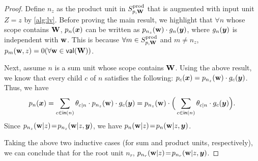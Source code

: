 \documentclass{article} %
\begin{document}
\begin{proof}
Define $n_z$ as the product unit in $S_{{p},\mathbf{W}}^{\mathrm{prod}}$ that is augmented with input unit $Z = z$ by \cref{alg:lv}. Before proving the main result, we highlight that $\forall n$ whose scope contains $\mathbf{W}$, ${p}_{n}(\boldsymbol{x})$ can be written as ${p}_{n_{z}}(\mathbf{w}) \cdot g_{n}(\boldsymbol{y})$, where $g_{n}(\boldsymbol{y})$ is independent with $\mathbf{w}$. This is because $\forall m \in S_{{p},\mathbf{W}}^{\mathrm{prod}}$ and $m \neq n_z$, ${p}_{m}(\mathbf{w},z) = 0 (\forall \mathbf{w} \in \mathsf{val}(\mathbf{W}))$.

Next, assume $n$ is a sum unit whose scope contains $\mathbf{W}$. Using the above result, we know that every child $c$ of $n$ satisfies the following: ${p}_{c} (\boldsymbol{x}) = {p}_{n_{z}}(\mathbf{w}) \cdot g_{c}(\boldsymbol{y})$. Thus, we have
    \begin{align*}
        {p}_{n} (\boldsymbol{x}) = \sum_{c \in \mathsf{in}(n)} \theta_{c \vert n} \cdot {p}_{n_{z}}(\mathbf{w}) \cdot g_{c}(\boldsymbol{y}) = {p}_{n_{z}}(\mathbf{w}) \cdot \Big ( \sum_{c \in \mathsf{in}(n)} \theta_{c \vert n} \cdot g_{c}(\boldsymbol{y}) \Big ).
    \end{align*}
Since ${p}_{n_z} (\mathbf{w} \vert z) \!=\! {p}_{n_z} (\mathbf{w} \vert z, \boldsymbol{y})$, we have ${p}_{n} (\mathbf{w} \vert z) \!=\! {p}_{n} (\mathbf{w} \vert z, \boldsymbol{y})$.

Taking the above two inductive cases (\ie for sum and product units, respectively), we can conclude that for the root unit $n_r$, ${p}_{n_r} (\mathbf{w} \vert z) \!=\! {p}_{n_r} (\mathbf{w} \vert z, \boldsymbol{y})$.
\end{proof}



\end{document}
